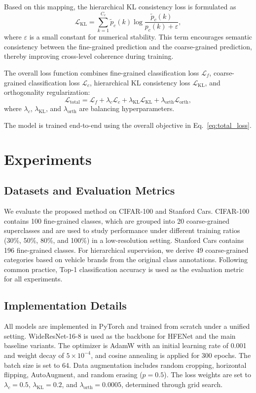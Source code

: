 \documentclass[pdflatex,iicol,sn-mathphys-num]{sn-jnl}
\theoremstyle{thmstyleone}%
\theoremstyle{thmstyletwo}%
\theoremstyle{thmstylethree}%
\begin{document}
Based on this mapping, the hierarchical KL consistency loss is formulated as
\begin{equation}
\mathcal{L}_{\mathrm{KL}} = \sum_{k=1}^{C_c} \tilde{p}_c(k)\log\frac{\tilde{p}_c(k)}{p_c(k)+\varepsilon},
\label{eq:kl_loss}
\end{equation}
where $\varepsilon$ is a small constant for numerical stability. 
This term encourages semantic consistency between the fine-grained prediction and the coarse-grained prediction, thereby improving cross-level coherence during training.

The overall loss function combines fine-grained classification loss $\mathcal{L}_f$, coarse-grained classification loss $\mathcal{L}_c$, hierarchical KL consistency loss $\mathcal{L}_{\mathrm{KL}}$, and orthogonality regularization:
\begin{equation}
\mathcal{L}_{\text{total}} = \mathcal{L}_f + \lambda_c \mathcal{L}_c + \lambda_{\mathrm{KL}} \mathcal{L}_{\mathrm{KL}} + \lambda_{\mathrm{orth}} \mathcal{L}_{\mathrm{orth}},
\label{eq:total_loss}
\end{equation}
where $\lambda_c$, $\lambda_{\mathrm{KL}}$, and $\lambda_{\mathrm{orth}}$ are balancing hyperparameters.

The model is trained end-to-end using the overall objective in Eq.~\eqref{eq:total_loss}.

\section{Experiments}
\label{sec:experiments}

\subsection{Datasets and Evaluation Metrics}
We evaluate the proposed method on CIFAR-100 and Stanford Cars. CIFAR-100 contains 100 fine-grained classes, which are grouped into 20 coarse-grained superclasses and are used to study performance under different training ratios (30\%, 50\%, 80\%, and 100\%) in a low-resolution setting. Stanford Cars contains 196 fine-grained classes. For hierarchical supervision, we derive 49 coarse-grained categories based on vehicle brands from the original class annotations. Following common practice, Top-1 classification accuracy is used as the evaluation metric for all experiments.

\subsection{Implementation Details}
All models are implemented in PyTorch and trained from scratch under a unified setting. WideResNet-16-8 is used as the backbone for HFENet and the main baseline variants. The optimizer is AdamW with an initial learning rate of 0.001 and weight decay of $5\times10^{-4}$, and cosine annealing is applied for 300 epochs. The batch size is set to 64. Data augmentation includes random cropping, horizontal flipping, AutoAugment, and random erasing ($p=0.5$). The loss weights are set to $\lambda_c=0.5$, $\lambda_{\mathrm{KL}}=0.2$, and $\lambda_{\mathrm{orth}}=0.0005$, determined through grid search.
\end{document}
